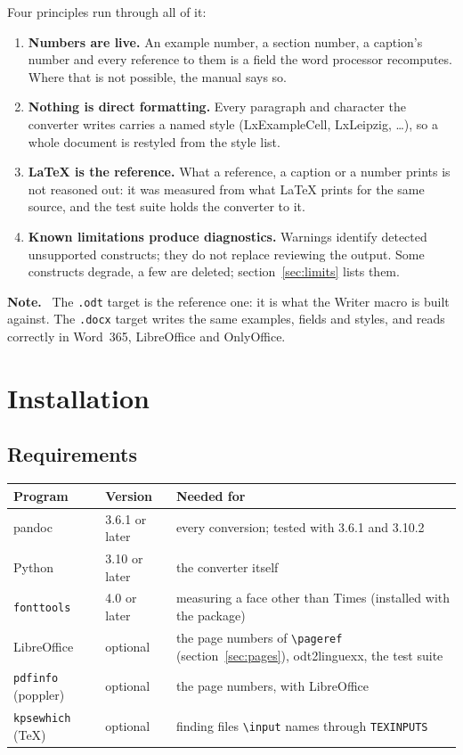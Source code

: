 \documentclass[11pt,a4paper]{article}
\newcommand{\cs}[1]{\texttt{\textbackslash #1}}
\newcommand{\file}[1]{\texttt{#1}}
\newcommand{\sty}[1]{\textsf{#1}}
\newcommand{\prog}[1]{\textsf{#1}}
\newenvironment{note}
  {\par\smallskip\noindent\begin{minipage}{\linewidth}\small\textbf{Note.}\ }
  {\end{minipage}\par\smallskip}
\begin{document}
Four principles run through all of it:
\begin{enumerate}
\item \textbf{Numbers are live.} An example number, a section number, a
  caption's number and every reference to them is a field the word processor
  recomputes. Where that is not possible, the manual says so.
\item \textbf{Nothing is direct formatting.} Every paragraph and character
  the converter writes carries a named style (\sty{LxExampleCell},
  \sty{LxLeipzig}, \ldots), so a whole document is restyled from the style
  list.
\item \textbf{\LaTeX{} is the reference.} What a reference, a caption or a
  number prints is not reasoned out: it was measured from what \LaTeX{}
  prints for the same source, and the test suite holds the converter to it.
\item \textbf{Known limitations produce diagnostics.} Warnings identify
  detected unsupported constructs; they do not replace reviewing the output.
  Some constructs degrade, a few are deleted; section~\ref{sec:limits} lists them.
\end{enumerate}

\begin{note}
The \file{.odt} target is the reference one: it is what the Writer macro is
built against. The \file{.docx} target writes the same examples, fields and
styles, and reads correctly in Word~365, LibreOffice and OnlyOffice.
\end{note}

\section{Installation}\label{sec:install}

\subsection{Requirements}

\begin{center}
\begin{tabular}{@{}l l p{6.6cm}@{}}
\toprule
\textbf{Program} & \textbf{Version} & \textbf{Needed for}\\
\midrule
pandoc & 3.6.1 or later & every conversion; tested with 3.6.1 and 3.10.2\\
Python & 3.10 or later & the converter itself\\
\texttt{fonttools} & 4.0 or later & measuring a face other than Times (installed with the package)\\
\midrule
LibreOffice & optional & the page numbers of \cs{pageref} (section~\ref{sec:pages}),
  \prog{odt2linguexx}, the test suite\\
\texttt{pdfinfo} (poppler) & optional & the page numbers, with LibreOffice\\
\texttt{kpsewhich} (\TeX{}) & optional & finding files \cs{input} names through \texttt{TEXINPUTS}\\
\bottomrule
\end{tabular}
\end{center}
\end{document}

